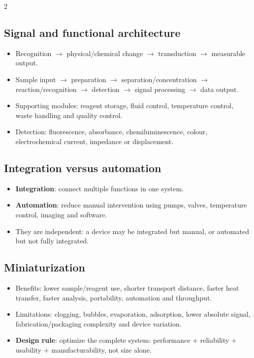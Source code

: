 \documentclass[10pt,a4paper]{ctexart}
\newcommand{\key}[1]{\textbf{#1}}
\begin{document}
\begin{multicols*}{2}
\subsection{Signal and functional architecture}
\begin{itemize}
	\item Recognition \(\rightarrow\) physical/chemical change \(\rightarrow\) transduction \(\rightarrow\) measurable output.
	\item Sample input \(\rightarrow\) preparation \(\rightarrow\) separation/concentration \(\rightarrow\) reaction/recognition \(\rightarrow\) detection \(\rightarrow\) signal processing \(\rightarrow\) data output.
	\item Supporting modules: reagent storage, fluid control, temperature control, waste handling and quality control.
	\item Detection: fluorescence, absorbance, chemiluminescence, colour, electrochemical current, impedance or displacement.
\end{itemize}

\subsection{Integration versus automation}
\begin{itemize}
	\item \key{Integration}: connect multiple functions in one system.
	\item \key{Automation}: reduce manual intervention using pumps, valves, temperature control, imaging and software.
	\item They are independent: a device may be integrated but manual, or automated but not fully integrated.
\end{itemize}

\subsection{Miniaturization}
\begin{itemize}
	\item Benefits: lower sample/reagent use, shorter transport distance, faster heat transfer, faster analysis, portability, automation and throughput.
	\item Limitations: clogging, bubbles, evaporation, adsorption, lower absolute signal, fabrication/packaging complexity and device variation.
	\item \key{Design rule}: optimize the complete system: performance + reliability + usability + manufacturability, not size alone.
\end{itemize}


\end{multicols*}
\end{document}
